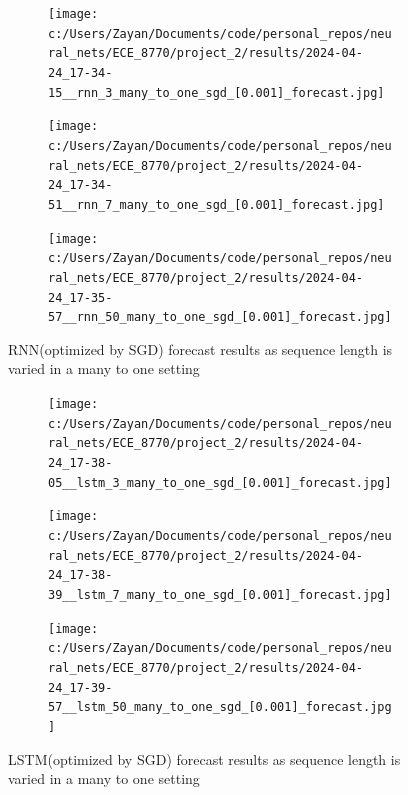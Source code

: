 \documentclass[12pt, letterpaper]{article}
\begin{document}
\begin{figure}[htpb]
    \centering
    \begin{subfigure}[b]{0.3\textwidth}
        \texttt{[image: c:/Users/Zayan/Documents/code/personal\_repos/neural\_nets/ECE\_8770/project\_2/results/2024-04-24\_17-34-15\_\_rnn\_3\_many\_to\_one\_sgd\_[0.001]\_forecast.jpg]}
    \end{subfigure}
    \begin{subfigure}[b]{0.3\textwidth}
        \texttt{[image: c:/Users/Zayan/Documents/code/personal\_repos/neural\_nets/ECE\_8770/project\_2/results/2024-04-24\_17-34-51\_\_rnn\_7\_many\_to\_one\_sgd\_[0.001]\_forecast.jpg]}
    \end{subfigure}
    \begin{subfigure}[b]{0.3\textwidth}
        \texttt{[image: c:/Users/Zayan/Documents/code/personal\_repos/neural\_nets/ECE\_8770/project\_2/results/2024-04-24\_17-35-57\_\_rnn\_50\_many\_to\_one\_sgd\_[0.001]\_forecast.jpg]}
    \end{subfigure}
    \caption{RNN(optimized by SGD) forecast results as sequence length is varied in a many to one setting}
    \label{fig: SGD-RNN forecast results as sequence length is varied in a many-to-one setting}
\end{figure}

\begin{figure}[htpb]
    \centering
    \begin{subfigure}[b]{0.3\textwidth}
        \texttt{[image: c:/Users/Zayan/Documents/code/personal\_repos/neural\_nets/ECE\_8770/project\_2/results/2024-04-24\_17-38-05\_\_lstm\_3\_many\_to\_one\_sgd\_[0.001]\_forecast.jpg]}
    \end{subfigure}
    \begin{subfigure}[b]{0.3\textwidth}
        \texttt{[image: c:/Users/Zayan/Documents/code/personal\_repos/neural\_nets/ECE\_8770/project\_2/results/2024-04-24\_17-38-39\_\_lstm\_7\_many\_to\_one\_sgd\_[0.001]\_forecast.jpg]}
    \end{subfigure}
    \begin{subfigure}[b]{0.3\textwidth}
        \texttt{[image: c:/Users/Zayan/Documents/code/personal\_repos/neural\_nets/ECE\_8770/project\_2/results/2024-04-24\_17-39-57\_\_lstm\_50\_many\_to\_one\_sgd\_[0.001]\_forecast.jpg]}
    \end{subfigure}
    \caption{LSTM(optimized by SGD) forecast results as sequence length is varied in a many to one setting}
    \label{fig: SGD-LSTM forecast results as sequence length is varied in a many-to-one setting}
\end{figure}
\end{document}
